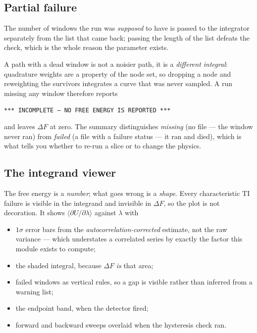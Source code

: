 \subsection{Partial failure}

The number of windows the run was \emph{supposed} to have is passed to the
integrator separately from the list that came back; passing the length of the
list defeats the check, which is the whole reason the parameter exists.

A path with a dead window is not a noisier path, it is a \emph{different
integral}: quadrature weights are a property of the node set, so dropping a node
and reweighting the survivors integrates a curve that was never sampled. A run
missing any window therefore reports
\begin{center}
\texttt{*** INCOMPLETE --- NO FREE ENERGY IS REPORTED ***}
\end{center}
and leaves $\Delta F$ at zero. The summary distinguishes \emph{missing} (no file
--- the window never ran) from \emph{failed} (a file with a failure status ---
it ran and died), which is what tells you whether to re-run a slice or to change
the physics.

\subsection{The integrand viewer}

The free energy is a \emph{number}; what goes wrong is a \emph{shape}. Every
characteristic TI failure is visible in the integrand and invisible in
$\Delta F$, so the plot is not decoration. It shows
$\langle\partial U/\partial\lambda\rangle$ against $\lambda$ with

\begin{itemize}[leftmargin=1.4em]
  \item $1\sigma$ error bars from the \emph{autocorrelation-corrected} estimate,
    not the raw variance --- which understates a correlated series by exactly
    the factor this module exists to compute;
  \item the shaded integral, because $\Delta F$ \emph{is} that area;
  \item failed windows as vertical rules, so a gap is visible rather than
    inferred from a warning list;
  \item the endpoint band, when the detector fired;
  \item forward and backward sweeps overlaid when the hysteresis check ran.
\end{itemize}

